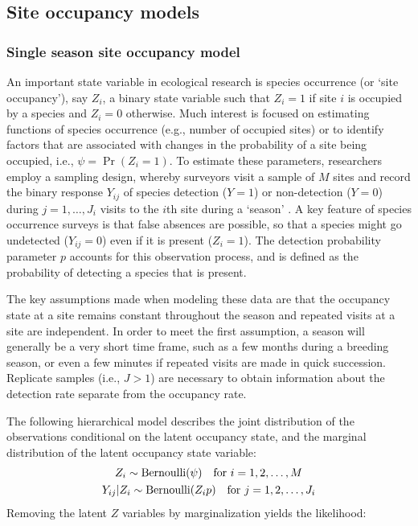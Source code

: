 \documentclass[article,shortnames]{jss}
\DeclareMathOperator{\Bern}{Bernoulli}
\begin{document}
\subsection{Site occupancy models}

\subsubsection{Single season site occupancy model}
\label{sec:occ}

An important state variable in ecological research is species occurrence
(or `site occupancy'), say $Z_{i}$, a binary state variable such that
$Z_{i}=1$ if site $i$ is occupied by a species and $Z_{i}=0$ otherwise.
Much interest is focused on estimating functions of species occurrence
(e.g., number of occupied sites) or to identify factors that are
associated with changes in the probability of a site being
occupied, i.e., $\psi  = \Pr(Z_{i}=1)$. To estimate these parameters,
researchers employ a sampling design, whereby surveyors visit a sample of $M$
sites and record the binary response $Y_{ij}$ of species detection ($Y=1$) or
non-detection ($Y=0$) during $j=1,\ldots,J_{i}$ visits to the $i$th site
during a `season' \citep{MacKenzie2002}.
A key feature of species occurrence surveys is that false absences are
possible, so that a species might go undetected ($Y_{ij} =0$) even if it is
present ($Z_{i} = 1$). The detection probability parameter $p$ accounts for this
observation process, and is defined as the
probability of detecting a species that is present.

The key assumptions made when modeling these data are that the occupancy
state at a site remains constant throughout the season and repeated visits at
a site are independent.  In order to meet the first assumption, a
season will generally be a very short time frame, such as
a few months during a breeding season, or even a few minutes if repeated
visits are made in quick succession.  Replicate samples (i.e., $J>1$) are
necessary to obtain information about the detection rate separate from
the occupancy rate.

The following hierarchical model describes the joint distribution of the
observations conditional on the latent occupancy state, and the marginal
distribution of the latent occupancy state variable:
\begin{gather}
Z_i \sim \Bern(\psi) \text{\quad for $i=1,2,\dots,M$} \notag \\
Y_{ij}|Z_i \sim \Bern(Z_i p)\text{\quad for $j=1,2,\dots,J_{i}$} \notag
\end{gather}
Removing the latent $Z$ variables by marginalization yields the likelihood:
\end{document}

